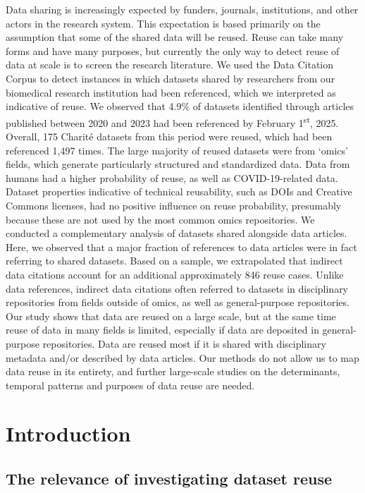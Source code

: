 \documentclass[
  letterpaper,
  DIV=11,
  numbers=noendperiod]{scrartcl}
\begin{document}
Data sharing is increasingly expected by funders, journals,
institutions, and other actors in the research system. This expectation
is based primarily on the assumption that some of the shared data will
be reused. Reuse can take many forms and have many purposes, but
currently the only way to detect reuse of data at scale is to screen the
research literature. We used the Data Citation Corpus to detect
instances in which datasets shared by researchers from our biomedical
research institution had been referenced, which we interpreted as
indicative of reuse. We observed that 4.9\% of datasets identified
through articles published between 2020 and 2023 had been referenced by
February 1\textsuperscript{st}, 2025. Overall, 175 Charité datasets from
this period were reused, which had been referenced 1,497 times. The
large majority of reused datasets were from `omics' fields, which
generate particularly structured and standardized data. Data from humans
had a higher probability of reuse, as well as COVID-19-related data.
Dataset properties indicative of technical reusability, such as DOIs and
Creative Commons licenses, had no positive influence on reuse
probability, presumably because these are not used by the most common
omics repositories. We conducted a complementary analysis of datasets
shared alongside data articles. Here, we observed that a major fraction
of references to data articles were in fact referring to shared
datasets. Based on a sample, we extrapolated that indirect data
citations account for an additional approximately 846 reuse cases.
Unlike data references, indirect data citations often referred to
datasets in disciplinary repositories from fields outside of omics, as
well as general-purpose repositories. Our study shows that data are
reused on a large scale, but at the same time reuse of data in many
fields is limited, especially if data are deposited in general-purpose
repositories. Data are reused most if it is shared with disciplinary
metadata and/or described by data articles. Our methods do not allow us
to map data reuse in its entirety, and further large-scale studies on
the determinants, temporal patterns and purposes of data reuse are
needed.

\newpage

\section{Introduction}\label{sec-intro}

\subsection{The relevance of investigating dataset
reuse}\label{sec-intro-rational}
\end{document}
